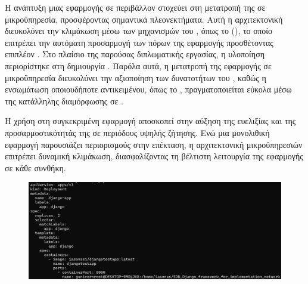 Η ανάπτυξη μιας εφαρμογής σε περιβάλλον  στοχεύει στη μετατροπή της σε μικροϋπηρεσία, προσφέροντας σημαντικά πλεονεκτήματα. Αυτή η αρχιτεκτονική διευκολύνει την κλιμάκωση μέσω των μηχανισμών του , όπως το  (), το οποίο επιτρέπει την αυτόματη προσαρμογή των πόρων της εφαρμογής προσθέτοντας επιπλέον . Στο πλαίσιο της παρούσας διπλωματικής εργασίας, η υλοποίηση περιορίστηκε στη δημιουργία . Παρόλα αυτά, η μετατροπή της εφαρμογής σε μικροϋπηρεσία διευκολύνει την αξιοποίηση των δυνατοτήτων του , καθώς η ενσωμάτωση οποιουδήποτε αντικειμένου, όπως το , πραγματοποιείται εύκολα μέσω της κατάλληλης διαμόρφωσης σε .

Η χρήση  στη συγκεκριμένη εφαρμογή αποσκοπεί στην αύξηση της ευελιξίας και της προσαρμοστικότητάς της σε περιόδους υψηλής ζήτησης. Ενώ μια μονολιθική εφαρμογή παρουσιάζει περιορισμούς στην επέκταση, η αρχιτεκτονική μικροϋπηρεσιών επιτρέπει δυναμική κλιμάκωση, διασφαλίζοντας τη βέλτιστη λειτουργία της εφαρμογής σε κάθε συνθήκη.

\FloatBarrier

\begin{figure}[h]
	\centering
	\includegraphics[width=1.0\textwidth]{graphics/kubernetes_use_case.png}
	\caption{ }
\end{figure}